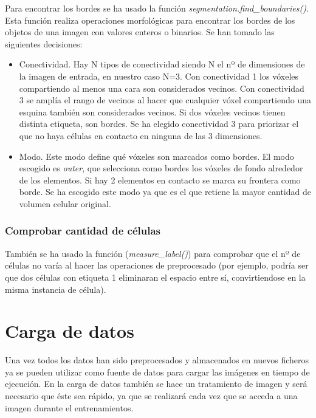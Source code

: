 Para encontrar los bordes se ha usado la función \textit{segmentation.find\_boundaries()}. Esta función realiza operaciones morfológicas para encontrar los bordes de los objetos de una imagen con valores enteros o binarios. Se han tomado las siguientes decisiones:
\begin{itemize}
\item Conectividad. Hay N tipos de conectividad siendo N el nº de dimensiones de la imagen de entrada, en nuestro caso N=3. Con conectividad 1 los vóxeles compartiendo al menos una cara son considerados vecinos. Con conectividad 3 se amplía el rango de vecinos al hacer que cualquier vóxel compartiendo una esquina también son considerados vecinos. Si dos vóxeles vecinos tienen distinta etiqueta, son bordes. Se ha elegido conectividad 3 para priorizar el que no haya células en contacto en ninguna de las 3 dimensiones.
\item Modo. Este modo define qué vóxeles son marcados como bordes. El modo escogido es \textit{outer}, que selecciona como bordes los vóxeles de fondo alrededor de los elementos. Si hay 2 elementos en contacto se marca su frontera como borde. Se ha escogido este modo ya que es el que retiene la mayor cantidad de volumen celular original.
\end{itemize}

\subsubsection{Comprobar cantidad de células}\label{subsubsec:multi_count_cells}

También se ha usado la función (\textit{measure\_label()}) para comprobar que el nº de células no varía al hacer las operaciones de preprocesado (por ejemplo, podría ser que dos células con etiqueta 1 eliminaran el espacio entre sí, convirtiendose en la misma instancia de célula).

\section{Carga de datos}\label{sec:carga_datos}

Una vez todos los datos han sido preprocesados y almacenados en nuevos ficheros ya se pueden utilizar como fuente de datos para cargar las imágenes en tiempo de ejecución. En la carga de datos también se hace un tratamiento de imagen y será necesario que éste sea rápido, ya que se realizará cada vez que se acceda a una imagen durante el entrenamientos.

